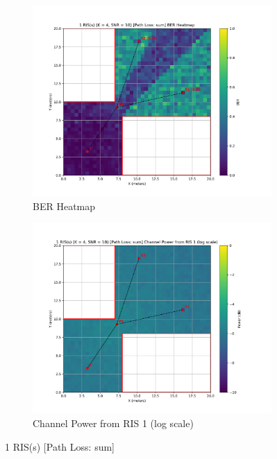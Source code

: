 \begin{figure}[H]
  \centering
  \begin{subfigure}[b]{0.48\textwidth}
    \centering
    \includegraphics[width=\textwidth]{imgs/heatmap-simulations/1 RIS(s) (K = 4, SNR = 10) [Path Loss_ sum] BER Heatmap.png}
    \caption{BER Heatmap}
  \end{subfigure}
  \hfill
  \begin{subfigure}[b]{0.48\textwidth}
    \centering
    \includegraphics[width=\textwidth]{imgs/heatmap-simulations/1 RIS(s) (K = 4, SNR = 10) [Path Loss_ sum] Channel Power from RIS 1 (log scale).png}
    \caption{Channel Power from RIS 1 (log scale)}
  \end{subfigure}
  \caption{1 RIS(s) [Path Loss: sum] }
\end{figure}


